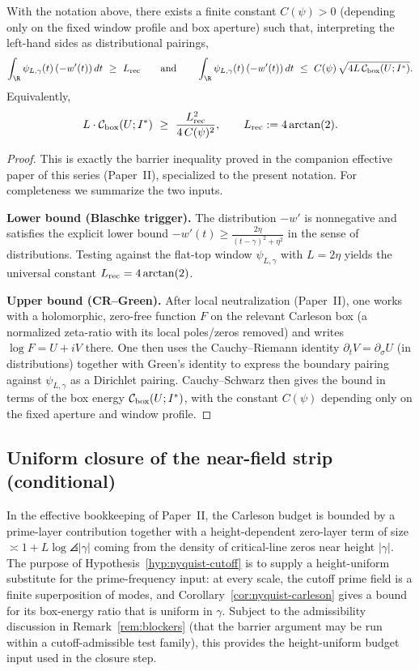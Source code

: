 \documentclass[11pt]{article}
\begin{document}
\begin{proposition}\label{prop:barrier-ineq}
With the notation above, there exists a finite constant $C(\psi)>0$ (depending only on the fixed window profile and box aperture) such that, interpreting the left-hand sides as distributional pairings,
\begin{equation}\label{eq:barrier-ineq}
  \int_{\R}\psi_{L,\gamma}(t)\,(-w'(t))\,dt\ \ge\ L_{\rm rec}
  \qquad\text{and}\qquad
  \int_{\R}\psi_{L,\gamma}(t)\,(-w'(t))\,dt\ \le\ C(\psi)\,\sqrt{4L\,\mathcal C_{\rm box}(U;I^\ast)}.
\end{equation}
Equivalently,
\[
  L\cdot \mathcal C_{\rm box}(U;I^\ast)\ \ge\ \frac{L_{\rm rec}^2}{4\,C(\psi)^2},
  \qquad
  L_{\rm rec}:=4\arctan(2).
\]
\end{proposition}
\begin{proof}
This is exactly the barrier inequality proved in the companion effective paper of this series (Paper~II), specialized to the present notation.
For completeness we summarize the two inputs.

\smallskip\noindent
\textbf{Lower bound (Blaschke trigger).}
The distribution $-w'$ is nonnegative and satisfies the explicit lower bound
$-w'(t)\ge \frac{2\eta}{(t-\gamma)^2+\eta^2}$ in the sense of distributions.
Testing against the flat-top window $\psi_{L,\gamma}$ with $L=2\eta$ yields the universal constant
$L_{\rm rec}=4\arctan(2)$.

\smallskip\noindent
\textbf{Upper bound (CR--Green).}
After local neutralization (Paper~II), one works with a holomorphic, zero-free function $F$ on the relevant Carleson box (a normalized zeta-ratio with its local poles/zeros removed) and writes $\log F=U+iV$ there.
One then uses the Cauchy--Riemann identity $\partial_t V=\partial_\sigma U$ (in distributions) together with Green's identity to express the boundary pairing against $\psi_{L,\gamma}$ as a Dirichlet pairing.
Cauchy--Schwarz then gives the bound in terms of the box energy $\mathcal C_{\rm box}(U;I^\ast)$, with the constant $C(\psi)$ depending only on the fixed aperture and window profile.
\end{proof}

\subsection*{Uniform closure of the near-field strip (conditional)}
In the effective bookkeeping of Paper~II, the Carleson budget is bounded by a prime-layer contribution together with a height-dependent zero-layer term of size $\asymp 1+L\log\angles{|\gamma|}$ coming from the density of critical-line zeros near height $|\gamma|$.
The purpose of Hypothesis~\ref{hyp:nyquist-cutoff} is to supply a height-uniform substitute for the prime-frequency input: at every scale, the cutoff prime field is a finite superposition of modes, and Corollary~\ref{cor:nyquist-carleson} gives a bound for its box-energy ratio that is uniform in $\gamma$.
Subject to the admissibility discussion in Remark~\ref{rem:blockers} (that the barrier argument may be run within a cutoff-admissible test family), this provides the height-uniform budget input used in the closure step.
\end{document}
